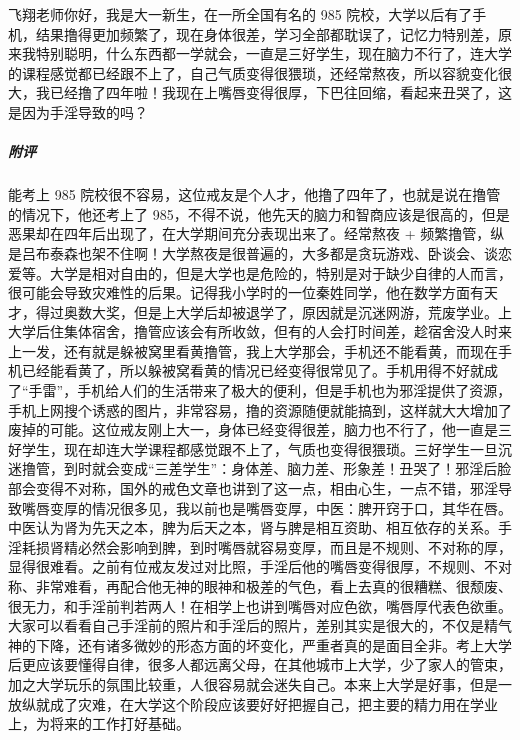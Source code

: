 \begin{case}
    飞翔老师你好，我是大一新生，在一所全国有名的 985 院校，大学以后有了手机，结果撸得更加频繁了，现在身体很差，学习全部都耽误了，记忆力特别差，原来我特别聪明，什么东西都一学就会，一直是三好学生，现在脑力不行了，连大学的课程感觉都已经跟不上了，自己气质变得很猥琐，还经常熬夜，所以容貌变化很大，我已经撸了四年啦！我现在上嘴唇变得很厚，下巴往回缩，看起来丑哭了，这是因为手淫导致的吗？
    \subparagraph{附评} 能考上 985 院校很不容易，这位戒友是个人才，他撸了四年了，也就是说在撸管的情况下，他还考上了 985，不得不说，他先天的脑力和智商应该是很高的，但是恶果却在四年后出现了，在大学期间充分表现出来了。经常熬夜 + 频繁撸管，纵是吕布泰森也架不住啊！大学熬夜是很普遍的，大多都是贪玩游戏、卧谈会、谈恋爱等。大学是相对自由的，但是大学也是危险的，特别是对于缺少自律的人而言，很可能会导致灾难性的后果。记得我小学时的一位秦姓同学，他在数学方面有天才，得过奥数大奖，但是上大学后却被退学了，原因就是沉迷网游，荒废学业。上大学后住集体宿舍，撸管应该会有所收敛，但有的人会打时间差，趁宿舍没人时来上一发，还有就是躲被窝里看黄撸管，我上大学那会，手机还不能看黄，而现在手机已经能看黄了，所以躲被窝看黄的情况已经变得很常见了。手机用得不好就成了“手雷”，手机给人们的生活带来了极大的便利，但是手机也为邪淫提供了资源，手机上网搜个诱惑的图片，非常容易，撸的资源随便就能搞到，这样就大大增加了废掉的可能。这位戒友刚上大一，身体已经变得很差，脑力也不行了，他一直是三好学生，现在却连大学课程都感觉跟不上了，气质也变得很猥琐。三好学生一旦沉迷撸管，到时就会变成“三差学生”：身体差、脑力差、形象差！丑哭了！邪淫后脸部会变得不对称，国外的戒色文章也讲到了这一点，相由心生，一点不错，邪淫导致嘴唇变厚的情况很多见，我以前也是嘴唇变厚，中医：脾开窍于口，其华在唇。中医认为肾为先天之本，脾为后天之本，肾与脾是相互资助、相互依存的关系。手淫耗损肾精必然会影响到脾，到时嘴唇就容易变厚，而且是不规则、不对称的厚，显得很难看。之前有位戒友发过对比照，手淫后他的嘴唇变得很厚，不规则、不对称、非常难看，再配合他无神的眼神和极差的气色，看上去真的很糟糕、很颓废、很无力，和手淫前判若两人！在相学上也讲到嘴唇对应色欲，嘴唇厚代表色欲重。大家可以看看自己手淫前的照片和手淫后的照片，差别其实是很大的，不仅是精气神的下降，还有诸多微妙的形态方面的坏变化，严重者真的是面目全非。考上大学后更应该要懂得自律，很多人都远离父母，在其他城市上大学，少了家人的管束，加之大学玩乐的氛围比较重，人很容易就会迷失自己。本来上大学是好事，但是一放纵就成了灾难，在大学这个阶段应该要好好把握自己，把主要的精力用在学业上，为将来的工作打好基础。
\end{case}


